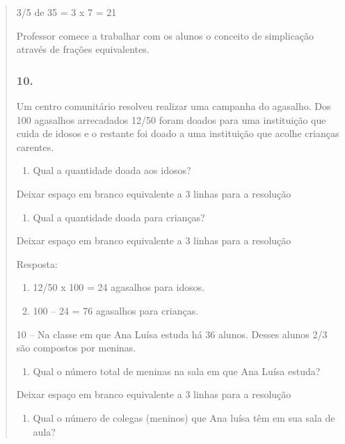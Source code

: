 \begin{enumerate}
\begin{escolha}
\begin{enumerate}
\begin{itemize}
\begin{itemize}
\begin{escolha}
\begin{quote}
\begin{escolha}
{3/5 de 35 = 3 x 7 = 21

Professor comece a trabalhar com os alunos o conceito de simplicação
através de frações equivalentes.

\subsubsection{10.}\label{section-113}

Um centro comunitário resolveu realizar uma campanha do agasalho. Dos
100 agasalhos arrecadados 12/50 foram doados para uma instituição que
cuida de idosos e o restante foi doado a uma instituição que acolhe
crianças carentes.

\begin{enumerate}
\def\labelenumi{\alph{enumi})}
\item
  Qual a quantidade doada aos idosos?
\end{enumerate}

Deixar espaço em branco equivalente a 3 linhas para a resolução

\begin{enumerate}
\def\labelenumi{\alph{enumi})}
\item
  Qual a quantidade doada para crianças?
\end{enumerate}

Deixar espaço em branco equivalente a 3 linhas para a resolução

Resposta:

\begin{enumerate}
\def\labelenumi{\alph{enumi})}
\item
  12/50 x 100 = 24 agasalhos para idosos.
\item
  100 -- 24 = 76 agasalhos para crianças.
\end{enumerate}

10 -- Na classe em que Ana Luísa estuda há 36 alunos. Desses alunos 2/3
são compostos por meninas.

\begin{enumerate}
\def\labelenumi{\alph{enumi})}
\item
  Qual o número total de meninas na sala em que Ana Luísa estuda?
\end{enumerate}

Deixar espaço em branco equivalente a 3 linhas para a resolução

\begin{enumerate}
\def\labelenumi{\alph{enumi})}
\item
  Qual o número de colegas (meninos) que Ana luísa têm em sua sala de
  aula?
\end{enumerate}

}
\end{escolha}
\end{quote}
\end{escolha}
\end{itemize}
\end{itemize}
\end{enumerate}
\end{escolha}
\end{enumerate}
